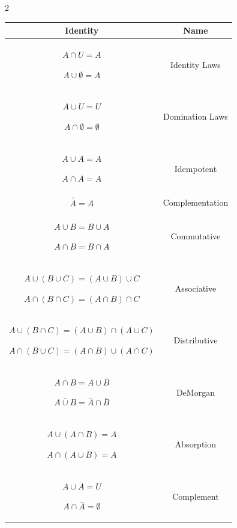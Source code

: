 \documentclass[9pt]{article}
\begin{document}
\begin{multicols}{2}
\begin{tabular}{|c|c|}
\hline
Identity & Name\\
\hline

$A\cap U=A$

$A\cup\emptyset=A$
&
Identity Laws
\\

\hline

$A\cup U=U$

$A\cap\emptyset=\emptyset$
&
Domination Laws
\\

\hline

$A\cup A=A$

$A\cap A=A$
&
Idempotent
\\

\hline

$\overline{\overline A}=A$
&
Complementation
\\

\hline

$A\cup B=B\cup A$

$A\cap B=B\cap A$
&
Commutative
\\

\hline

$A\cup(B\cup C)=(A\cup B)\cup C$

$A\cap(B\cap C)=(A\cap B)\cap C$
&
Associative
\\

\hline

$A\cup(B\cap C)=(A\cup B)\cap(A\cup C)$

$A\cap(B\cup C)=(A\cap B)\cup(A\cap C)$
&
Distributive
\\

\hline

$\overline{A\cap B}=\overline A\cup\overline B$

$\overline{A\cup B}=\overline A\cap\overline B$
&
DeMorgan
\\

\hline

$A\cup(A\cap B)=A$

$A\cap(A\cup B)=A$
&
Absorption
\\

\hline

$A\cup\overline A=U$

$A\cap\overline A=\emptyset$
&
Complement
\\

\hline
\end{tabular}


\end{multicols}
\end{document}
